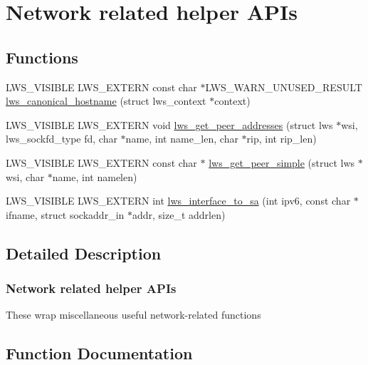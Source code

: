 \hypertarget{group__net}{}\section{Network related helper A\+P\+Is}
\label{group__net}
\subsection*{Functions}
\begin{DoxyCompactItemize}
\item 
L\+W\+S\+\_\+\+V\+I\+S\+I\+B\+LE L\+W\+S\+\_\+\+E\+X\+T\+E\+RN const char $\ast$L\+W\+S\+\_\+\+W\+A\+R\+N\+\_\+\+U\+N\+U\+S\+E\+D\+\_\+\+R\+E\+S\+U\+LT \hyperlink{group__net_gad0df22db2be9fc65a667a1e83f9a92a4}{lws\+\_\+canonical\+\_\+hostname} (struct lws\+\_\+context $\ast$context)
\item 
L\+W\+S\+\_\+\+V\+I\+S\+I\+B\+LE L\+W\+S\+\_\+\+E\+X\+T\+E\+RN void \hyperlink{group__net_ga092e5f473b3347f03ffeef8a950080f3}{lws\+\_\+get\+\_\+peer\+\_\+addresses} (struct lws $\ast$wsi, lws\+\_\+sockfd\+\_\+type fd, char $\ast$name, int name\+\_\+len, char $\ast$rip, int rip\+\_\+len)
\item 
L\+W\+S\+\_\+\+V\+I\+S\+I\+B\+LE L\+W\+S\+\_\+\+E\+X\+T\+E\+RN const char $\ast$ \hyperlink{group__net_gad01014fed09759741b6d23afccfdaacc}{lws\+\_\+get\+\_\+peer\+\_\+simple} (struct lws $\ast$wsi, char $\ast$name, int namelen)
\item 
L\+W\+S\+\_\+\+V\+I\+S\+I\+B\+LE L\+W\+S\+\_\+\+E\+X\+T\+E\+RN int \hyperlink{group__net_ga869d8bdffb0f2a7ce08e3ce10d6be3d8}{lws\+\_\+interface\+\_\+to\+\_\+sa} (int ipv6, const char $\ast$ifname, struct sockaddr\+\_\+in $\ast$addr, size\+\_\+t addrlen)
\end{DoxyCompactItemize}


\subsection{Detailed Description}
\subsubsection*{Network related helper A\+P\+Is}

These wrap miscellaneous useful network-\/related functions 

\subsection{Function Documentation}
